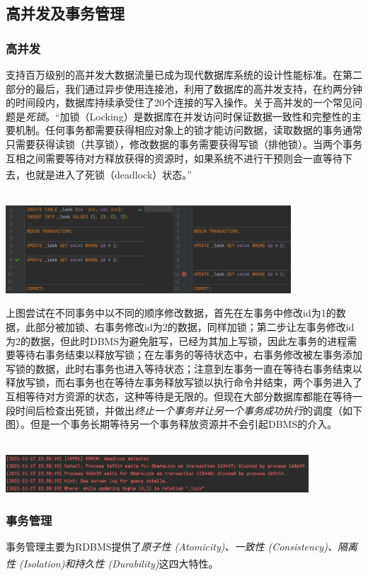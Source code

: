 \subsection{高并发及事务管理}
\subsubsection{高并发}
支持百万级别的高并发大数据流量已成为现代数据库系统的设计性能标准。在第二部分的最后，我们通过异步使用连接池，利用了数据库的高并发支持，在约两分钟的时间段内，数据库持续承受住了20个连接的写入操作。关于高并发的一个常见问题是\emph{死锁}。“加锁（Locking）是数据库在并发访问时保证数据一致性和完整性的主要机制。任何事务都需要获得相应对象上的锁才能访问数据，读取数据的事务通常只需要获得读锁（共享锁），修改数据的事务需要获得写锁（排他锁）。当两个事务互相之间需要等待对方释放获得的资源时，如果系统不进行干预则会一直等待下去，也就是进入了死锁（deadlock）状态。”\textsuperscript{\cite{dong-2021}}\\~\\
\centerline{\includegraphics[width=0.8\textwidth]{sp/lkdemo}}
\par 上图尝试在不同事务中以不同的顺序修改数据，首先在左事务中修改id为1的数据，此部分被加锁、右事务修改id为2的数据，同样加锁；第二步让左事务修改id为2的数据，但此时DBMS为避免脏写，已经为其加上写锁，因此左事务的进程需要等待右事务结束以释放写锁；在左事务的等待状态中，右事务修改被左事务添加写锁的数据，此时右事务也进入等待状态；注意到左事务一直在等待右事务结束以释放写锁，而右事务也在等待左事务释放写锁以执行命令并结束，两个事务进入了互相等待对方资源的状态，这种等待是无限的。但现在大部分数据库都能在等待一段时间后检查出死锁，并做出\emph{终止一个事务并让另一个事务成功执行}的调度（如下图）。但是一个事务长期等待另一个事务释放资源并不会引起DBMS的介入。\\~\\
\centerline{\includegraphics[width=0.85\textwidth]{sp/dlock}}


\subsubsection{事务管理}
事务管理主要为RDBMS提供了\emph{原子性 (Atomicity)、一致性 (Consistency)、隔离性 (Isolation)和持久性 (Durability)}这四大特性\textsuperscript{\cite{silberschatz-2010}}。

